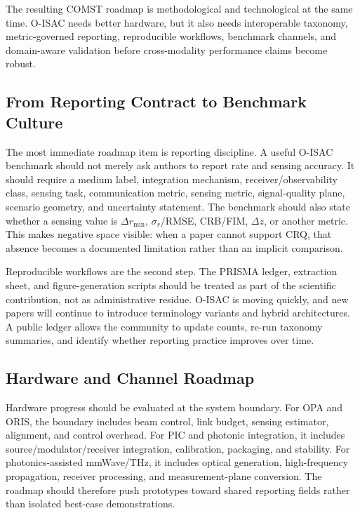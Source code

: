 \documentclass[letterpaper,journal]{IEEEtran}
\begin{document}
The resulting COMST roadmap is methodological and technological at the same time. O-ISAC needs better hardware, but it also needs interoperable taxonomy, metric-governed reporting, reproducible workflows, benchmark channels, and domain-aware validation before cross-modality performance claims become robust.

\subsection{From Reporting Contract to Benchmark Culture}

The most immediate roadmap item is reporting discipline. A useful O-ISAC benchmark should not merely ask authors to report rate and sensing accuracy. It should require a medium label, integration mechanism, receiver/observability class, sensing task, communication metric, sensing metric, signal-quality plane, scenario geometry, and uncertainty statement. The benchmark should also state whether a sensing value is \(\Delta r_{\min}\), \(\sigma_r\)/RMSE, CRB/FIM, \(\Delta z\), or another metric. This makes negative space visible: when a paper cannot support CRQ, that absence becomes a documented limitation rather than an implicit comparison.

Reproducible workflows are the second step. The PRISMA ledger, extraction sheet, and figure-generation scripts should be treated as part of the scientific contribution, not as administrative residue. O-ISAC is moving quickly, and new papers will continue to introduce terminology variants and hybrid architectures. A public ledger allows the community to update counts, re-run taxonomy summaries, and identify whether reporting practice improves over time.

\subsection{Hardware and Channel Roadmap}

Hardware progress should be evaluated at the system boundary. For OPA and ORIS, the boundary includes beam control, link budget, sensing estimator, alignment, and control overhead. For PIC and photonic integration, it includes source/modulator/receiver integration, calibration, packaging, and stability. For photonics-assisted mmWave/THz, it includes optical generation, high-frequency propagation, receiver processing, and measurement-plane conversion. The roadmap should therefore push prototypes toward shared reporting fields rather than isolated best-case demonstrations.
\end{document}
